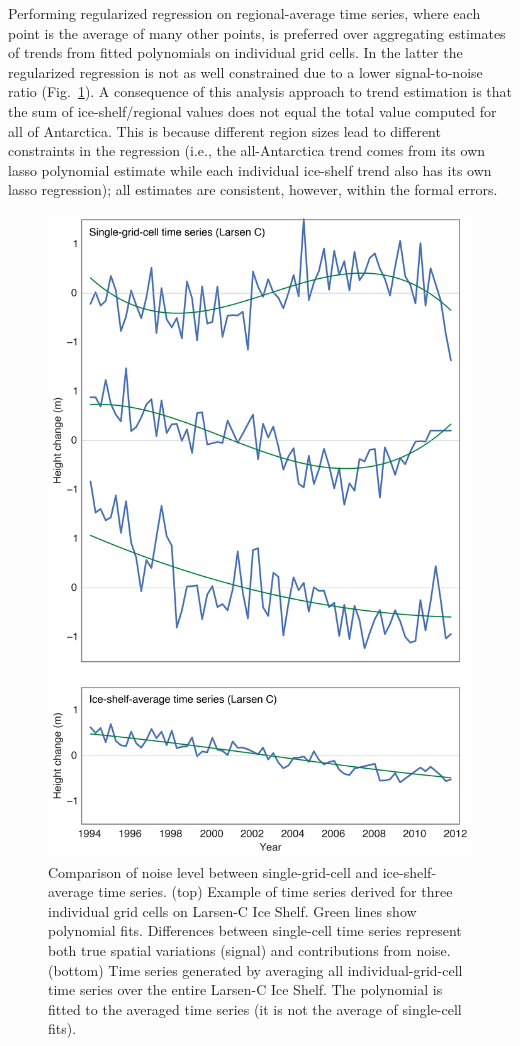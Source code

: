 Performing regularized regression on regional-average time series, where each point is the average of many other points, is preferred over aggregating estimates of trends from fitted polynomials on individual grid cells. In the latter the regularized regression is not as well constrained due to a lower signal-to-noise ratio (Fig.~\ref{c2f8}). A consequence of this analysis approach to trend estimation is that the sum of ice-shelf/regional values does not equal the total value computed for all of Antarctica. This is because different region sizes lead to different constraints in the regression (i.e., the all-Antarctica trend comes from its own lasso polynomial estimate while each individual ice-shelf trend also has its own lasso regression); all estimates are consistent, however, within the formal errors.


\begin{figure}[!ht]
  \centering
  \vspace{.5cm}
  \includegraphics[width=.73\textwidth]{img/map_noisy_series_v3.png}
  \caption[Noise level of single versus average time series]{
  Comparison of noise level between single-grid-cell and ice-shelf-average time series. (top) Example of time series derived for three individual grid cells on Larsen-C Ice Shelf. Green lines show polynomial fits. Differences between single-cell time series represent both true spatial variations (signal) and contributions from noise. (bottom) Time series generated by averaging all individual-grid-cell time series over the entire Larsen-C Ice Shelf. The polynomial is fitted to the averaged time series (it is not the average of single-cell fits).
  } 
  \label{c2f8}
\end{figure}


